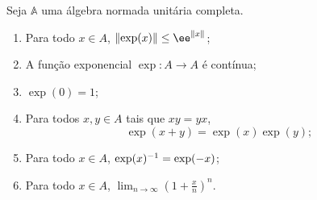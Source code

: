 \begin{prop}
Seja $\mathbb A$ uma álgebra normada unitária completa.
	\begin{enumerate}
	\item Para todo $x \in A$, $\nor{\exp(x)} \leq \ee^{\nor{x}}$;
	\item A função exponencial $\exp\colon A \to A$ é contínua;
	\item $\exp(0) = 1$;
	\item Para todos $x,y \in A$ tais que $xy=yx$,
		\begin{equation*}
		\exp(x+y) = \exp(x)\exp(y);
		\end{equation*}
	\item Para todo $x \in A$, $\exp(x)^{-1} = \exp(-x)$;
	\item Para todo $x \in A$, $\lim_{n \to \infty} \left( 1 + \frac{x}{n} \right)^n$.
	\end{enumerate}
\end{prop}
